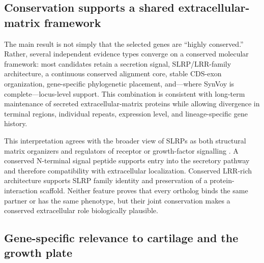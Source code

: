 
\subsection{Conservation supports a shared extracellular-matrix framework}
\label{subsec:discussion-main-findings}

The main result is not simply that the selected genes are ``highly conserved.''
Rather, several independent evidence types converge on a conserved molecular
framework: most candidates retain a secretion signal, SLRP/LRR-family
architecture, a continuous conserved alignment core, stable CDS-exon
organization, gene-specific phylogenetic placement, and---where SynVoy is
complete---locus-level support. This combination is consistent with long-term
maintenance of secreted extracellular-matrix proteins while allowing divergence
in terminal regions, individual repeats, expression level, and lineage-specific
gene history.

This interpretation agrees with the broader view of SLRPs as both structural
matrix organizers and regulators of receptor or growth-factor signalling
\citep{SchaeferIozzo2008,IozzoSchaefer2015}. A conserved N-terminal signal
peptide supports entry into the secretory pathway and therefore compatibility
with extracellular localization. Conserved LRR-rich architecture supports SLRP
family identity and preservation of a protein-interaction scaffold. Neither
feature proves that every ortholog binds the same partner or has the same
phenotype, but their joint conservation makes a conserved extracellular role
biologically plausible.

\subsection{Gene-specific relevance to cartilage and the growth plate}
\label{subsec:discussion-biological-relevance}

